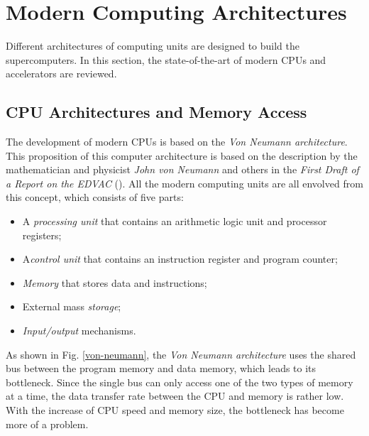 \section{Modern Computing Architectures}\label{Modern Computing Architectures}

Different architectures of computing units are designed to build the supercomputers. In this section, the state-of-the-art of modern CPUs and accelerators are reviewed.

\subsection{CPU Architectures and Memory Access}

The development of modern CPUs is based on the \textit{Von Neumann architecture}. This proposition of this computer architecture is based on the description by the mathematician and physicist \textit{John von Neumann} and others in the \textit{First Draft of a Report on the EDVAC} (\cite{von1945first}). All the modern computing units are all envolved from this concept, which consists of five parts:

\begin{itemize}
	\item A \textit{processing unit} that contains an arithmetic logic unit and processor registers;
	\item A\textit{control unit} that contains an instruction register and program counter;
	\item \textit{Memory} that stores data and instructions;
	\item External mass \textit{storage};
	\item \textit{Input/output} mechanisms.
\end{itemize}

As shown in Fig. \ref{von-neumann}, the \textit{Von Neumann architecture} uses the shared bus between the program memory and data memory, which leads to its bottleneck. Since the single bus can only access one of the two types of memory at a time, the data transfer rate between the CPU and memory is rather low. With the increase of CPU speed and memory size,  the bottleneck has become more of a problem.

